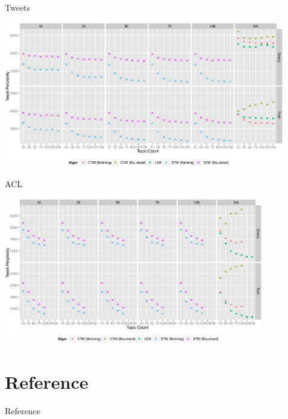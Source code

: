 \documentclass[xcolor=dvipsnames]{beamer}
\begin{document}
\begin{frame}{Tweets}
\begin{center}
  \includegraphics[height=2.5in]{Images/tweet-all.eps}
\end{center}
\end{frame}


\begin{frame}{ACL}
\begin{center}
  \includegraphics[height=2.5in]{Images/acl-all.eps}
\end{center}
\end{frame}






\section{Reference}
\begin{frame}[allowframebreaks]{Reference}






\end{frame}
\end{document}
